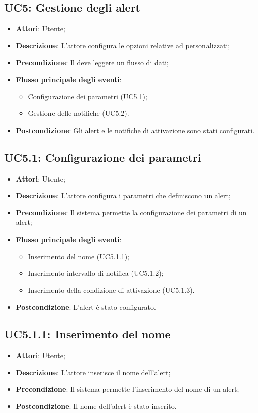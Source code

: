 \subsection{UC5: Gestione degli alert}
\begin{itemize}
	\item \textbf{Attori}: Utente;
	\item \textbf{Descrizione}: L'attore configura le opzioni relative ad  personalizzati;
	\item \textbf{Precondizione}: Il  deve leggere un flusso di dati;
	\item \textbf{Flusso principale degli eventi}:
		\begin{itemize}
			\item Configurazione dei parametri (UC5.1);
			\item Gestione delle notifiche (UC5.2).
		\end{itemize}
	\item \textbf{Postcondizione}: Gli alert e le notifiche di attivazione sono stati configurati.
\end{itemize}

\subsection{UC5.1: Configurazione dei parametri}
\begin{itemize}
	\item \textbf{Attori}: Utente;
	\item \textbf{Descrizione}: L'attore configura i parametri che definiscono un alert;
	\item \textbf{Precondizione}: Il sistema permette la configurazione dei parametri di un alert;
	\item \textbf{Flusso principale degli eventi}:
		\begin{itemize}
			\item Inserimento del nome (UC5.1.1);
			\item Inserimento intervallo di notifica (UC5.1.2);
			\item Inserimento della condizione di attivazione (UC5.1.3).
		\end{itemize}
	\item \textbf{Postcondizione}: L'alert è stato configurato.
\end{itemize}

\subsection{UC5.1.1: Inserimento del nome}
\begin{itemize}
	\item \textbf{Attori}: Utente;
	\item \textbf{Descrizione}: L'attore inserisce il nome dell'alert;
	\item \textbf{Precondizione}: Il sistema permette l'inserimento del nome di un alert;
	\item \textbf{Postcondizione}: Il nome dell'alert è stato inserito.
\end{itemize}

